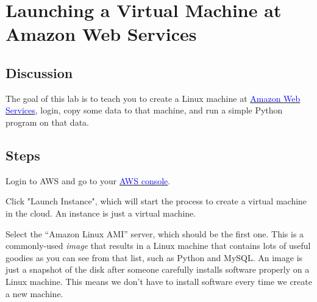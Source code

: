 \chapter{Launching a Virtual Machine at Amazon Web Services}
\label{ch:1}

\setcounter{problem}{1}

\section{Discussion}

\begin{fullwidth}

The goal of this lab is to teach you to create a Linux machine at \href{http://aws.amazon.com}{\textcolor{blue}{Amazon Web Services}}, login, copy some data to that machine, and run a simple Python program on that data.

\section{Steps}

\step Login to AWS and go to your \href{http://aws.amazon.com/console/}{\textcolor{blue}{AWS console}}.


\step Click "Launch Instance", which will start the process to create a virtual machine in the cloud. An instance is just a virtual machine.


\step Select the ``Amazon Linux AMI'' server, which should be the first one.  This is a commonly-used {\em image} that results in a Linux machine that contains lots of useful goodies as you can see from that list, such as Python and MySQL. An image is just a snapshot of the disk after someone carefully installs software properly on a Linux machine. This means we don't have to install software every time we create a new machine.


\end{fullwidth}
